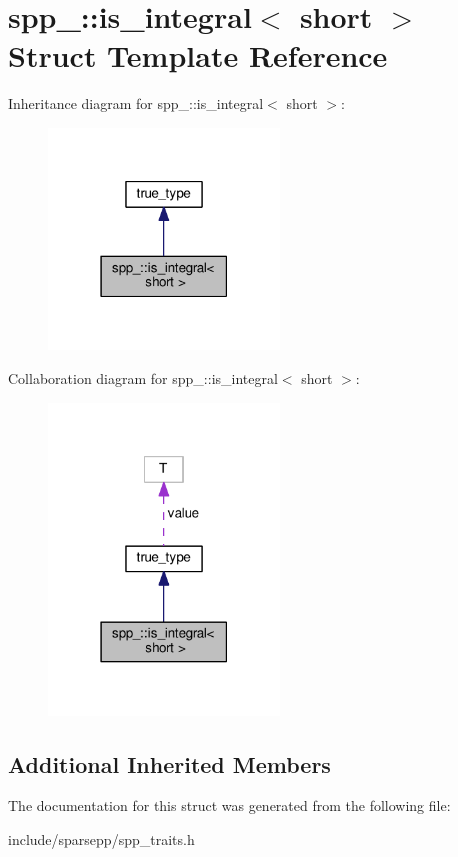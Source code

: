 \hypertarget{structspp___1_1is__integral_3_01short_01_4}{}\section{spp\+\_\+\+:\+:is\+\_\+integral$<$ short $>$ Struct Template Reference}
\label{structspp___1_1is__integral_3_01short_01_4}


Inheritance diagram for spp\+\_\+\+:\+:is\+\_\+integral$<$ short $>$\+:\nopagebreak
\begin{figure}[H]
\begin{center}
\leavevmode
\includegraphics[width=174pt]{structspp___1_1is__integral_3_01short_01_4__inherit__graph}
\end{center}
\end{figure}


Collaboration diagram for spp\+\_\+\+:\+:is\+\_\+integral$<$ short $>$\+:\nopagebreak
\begin{figure}[H]
\begin{center}
\leavevmode
\includegraphics[width=174pt]{structspp___1_1is__integral_3_01short_01_4__coll__graph}
\end{center}
\end{figure}
\subsection*{Additional Inherited Members}


The documentation for this struct was generated from the following file\+:\begin{DoxyCompactItemize}
\item 
include/sparsepp/spp\+\_\+traits.\+h\end{DoxyCompactItemize}
